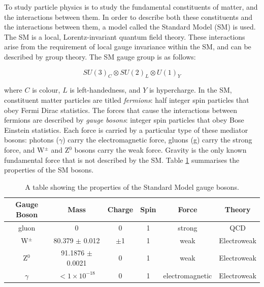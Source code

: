 \documentclass[12pt,a4paper,epsf,portrait,times,epsfig]{article}
\begin{document}
To study particle physics is to study the fundamental constituents of matter, and the interactions between them. In order to describe both these constituents and the interactions between them, a model called the Standard Model (SM) is used. The SM is a local, Lorentz-invariant quantum field theory. These interactions arise from the requirement of local gauge invariance within the SM, and can be described by group theory. The SM gauge group is as follows: 

\begin{center}
	\begin{equation}
	SU(3)_{C} \otimes SU(2)_{L} \otimes U(1)_{Y}
	\end{equation}
\end{center}

where $C$ is colour, $L$ is left-handedness, and $Y$ is hypercharge. 
In the SM, constituent matter particles are titled \textit{fermions}: half integer spin particles that obey Fermi Dirac statistics. The forces that cause the interactions between fermions are described by \textit{gauge bosons}: integer spin particles that obey Bose Einstein statistics. Each force is carried by a particular type of these mediator bosons: photons ($\gamma$) carry the electromagnetic force, gluons (g) carry the strong force, and W$^{\pm}$ and Z$^{0}$ bosons carry the weak force. Gravity is the only known fundamental force that is not described by the SM. Table \ref{tab:SMBosons} summarises the properties of the SM bosons. \par

\begin{table}
	\begin{center}
		\begin{tabular}{ |c|c|c|c|c|c| }
			\hline \hline
			Gauge Boson & Mass & Charge & Spin & Force & Theory \\
			\hline
			gluon & 0 & 0 & 1 & strong & QCD \\
			\hline
			W$^{\pm}$ & 80.379 $\pm$ 0.012 & $\pm$1 & 1 & weak & Electroweak \\
			\hline
			Z$^{0}$ & 91.1876 $\pm$ 0.0021 & 0 & 1 & weak & Electroweak \\
			\hline
			$\gamma$ & $ < 1 \times 10^{-18}$ & 0 & 1 & electromagnetic & Electroweak \\
			\hline \hline
		\end{tabular}
		\caption{A table showing the properties of the Standard Model gauge bosons\cite{Article:PDG}.}
		\label{tab:SMBosons}
	\end{center}
\end{table}
\end{document}
